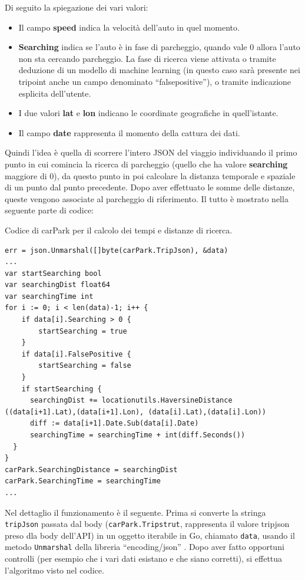 \documentclass[italian, Lau, oneside, nodefaultfont, noexaminfo]{sapthesis}
\begin{document}
Di seguito la spiegazione dei vari valori:
\begin{itemize}
	\item Il campo \textbf{speed} indica la velocità dell'auto in quel momento.
	\item \textbf{Searching} indica se l'auto è in fase di parcheggio, quando vale 0 allora l'auto non sta cercando parcheggio. La fase di ricerca viene  attivata o tramite deduzione di un modello di machine learning (in questo caso sarà presente nei tripoint anche un campo denominato ``falsepositive''), o tramite indicazione esplicita dell'utente.
	\item I due valori \textbf{lat} e \textbf{lon} indicano le coordinate geografiche in quell'istante.
	\item Il campo \textbf{date} rappresenta il momento della cattura dei dati. 
\end{itemize}


Quindi l'idea è quella di scorrere l'intero JSON del viaggio individuando il primo punto in cui comincia la ricerca di parcheggio (quello che ha valore \textbf{searching} maggiore di 0), da questo punto in poi calcolare la distanza temporale e spaziale di un punto dal punto precedente. Dopo aver effettuato le somme delle distanze, queste vengono associate al parcheggio di riferimento. Il tutto è mostrato nella seguente parte di codice:


\begin{listing}[H]
\caption{Codice di carPark per il calcolo dei tempi e distanze di ricerca.}
\begin{verbatim}
err = json.Unmarshal([]byte(carPark.TripJson), &data)
...               
var startSearching bool
var searchingDist float64
var searchingTime int
for i := 0; i < len(data)-1; i++ {
	if data[i].Searching > 0 {
		startSearching = true
	}
	if data[i].FalsePositive {
		startSearching = false
	}
	if startSearching {
	  searchingDist += locationutils.HaversineDistance ((data[i+1].Lat),(data[i+1].Lon), (data[i].Lat),(data[i].Lon))
	  diff := data[i+1].Date.Sub(data[i].Date)
	  searchingTime = searchingTime + int(diff.Seconds())
  }
}
carPark.SearchingDistance = searchingDist
carPark.SearchingTime = searchingTime
...
\end{verbatim}
\end{listing}

Nel dettaglio il funzionamento è il seguente. Prima si converte la stringa \texttt{tripJson} passata dal body (\texttt{carPark.Tripstrut}, rappresenta il valore tripjson preso dla body dell'API) in un oggetto iterabile in Go, chiamato \texttt{data}, usando il metodo \texttt{Unmarshal} della libreria ``encoding/json''  \cite{ref:encoding-json}. Dopo aver fatto opportuni controlli (per esempio che i vari dati esistano e che siano corretti), si effettua l'algoritmo visto nel codice. 
\end{document}
